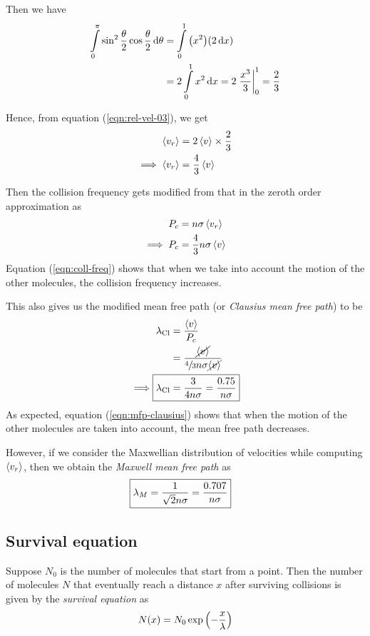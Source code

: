 			Then we have
			\begin{align*}
				\int\limits_{0}^{\pi}{\sin^2{\dfrac{\theta}{2}}\cos{\dfrac{\theta}{2}}\dd{\theta}}&=\int\limits_{0}^{1}{\qty(x^2)\qty(2\dd{x})} \\
					&=2\int\limits_{0}^{1}{x^2\dd{x}}=2\left.\dfrac{x^3}{3}\right|_{0}^{1}=\dfrac{2}{3}
			\end{align*}
			
			Hence, from equation (\ref{eqn:rel-vel-03}), we get
			\begin{align*}
				\expval{v_r}&=2\expval{v}\times\dfrac{2}{3} \\
				\implies\expval{v_r}&=\dfrac{4}{3}\expval{v}
			\end{align*}
			
			Then the collision frequency gets modified from that in the zeroth order approximation as
			\begin{align}
				P_c&=n\sigma\expval{v_r} \nonumber\\
				\implies P_c&=\dfrac{4}{3}n\sigma\expval{v} \label{eqn:coll-freq}
			\end{align}
			Equation (\ref{eqn:coll-freq}) shows that when we take into account the motion of the other molecules, the collision frequency increases.
			
			This also gives us the modified mean free path (or \emph{Clausius mean free path}) to be
			\begin{align}
				\lambda_\text{Cl}&=\dfrac{\expval{v}}{P_c} \nonumber\\
					&=\dfrac{\cancel{\expval{v}}}{\sfrac{4}{3}n\sigma\cancel{\expval{v}}} \nonumber\\
				\implies\Aboxed{\lambda_\text{Cl}&=\dfrac{3}{4n\sigma}=\dfrac{0.75}{n\sigma}} \label{eqn:mfp-clausius}
			\end{align}
			As expected, equation (\ref{eqn:mfp-clausius}) shows that when the motion of the other molecules are taken into account, the mean free path decreases.
			
			However, if we consider the Maxwellian distribution of velocities while computing $\expval{v_r}$, then we obtain the \emph{Maxwell mean free path} as
			\begin{align}
				\Aboxed{\lambda_M&=\dfrac{1}{\sqrt{2}n\sigma}=\dfrac{0.707}{n\sigma}} \label{eqn:mfp-maxwell}
			\end{align}
			
	\subsection{Survival equation}
		Suppose $N_0$ is the number of molecules that start from a point. Then the number of molecules $N$ that eventually reach a distance $x$ after surviving collisions is given by the \emph{survival equation} as
		\begin{align*}
			N(x)=N_0\exp\qty(-\dfrac{x}{\lambda})
		\end{align*}
			
